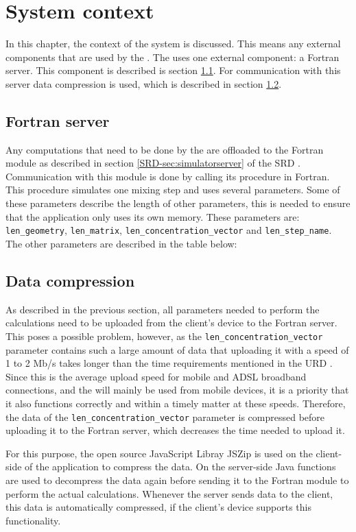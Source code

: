 \chapter{System context}
\label{chap:systcontext}
In this chapter, the context of the system is discussed. This means any external components that are used by the \applicationname{}. The \applicationname{} uses one external component: a Fortran server. This component is described is section \ref{sec:fortranserver}. For communication with this server data compression is used, which is described in section \ref{sec:datacomp}.

\section{Fortran server}
\label{sec:fortranserver}
Any computations that need to be done by the \applicationname{} are offloaded to the Fortran module as described in section 
\ref*{SRD-sec:simulatorserver} of the SRD \cite{srd}. Communication with this module is done by calling its procedure in Fortran. This procedure simulates one mixing step and uses several parameters. Some of these parameters describe the length of other parameters, this is needed to ensure that the application only uses its own memory. These parameters are: \texttt{len\_geometry}, \texttt{len\_matrix}, \texttt{len\_concentration\_vector} and \texttt{len\_step\_name}. The other parameters are described in the table below:

\begin{center}
\end{center}

\section{Data compression}
\label{sec:datacomp}
As described in the previous section, all parameters needed to perform the calculations need to be uploaded from the client's device to the Fortran server. This poses a possible problem, however, as the \texttt{len\_concentration\_vector} parameter contains such a large amount of data that uploading it with a speed of 1 to 2 Mb/s takes longer than the time requirements mentioned in the URD \cite{urd}. Since this is the average upload speed for mobile and ADSL broadband connections, and the \applicationname{} will mainly be used from mobile devices, it is a priority that it also functions correctly and within a timely matter at these speeds. Therefore, the data of the \texttt{len\_concentration\_vector} parameter is compressed before uploading it to the Fortran server, which decreases the time needed to upload it.

For this purpose, the open source JavaScript Libray JSZip \cite{jszip} is used on the client-side of the application to compress the data. On the server-side Java functions are used to decompress the data again before sending it to the Fortran module to perform the actual calculations. Whenever the server sends data to the client, this data is automatically compressed, if the client's device supports this functionality.